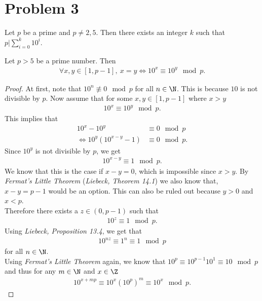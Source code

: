 \documentclass{article}
\begin{document}
\section*{Problem 3}
\begin{claim}
	Let $p$ be a prime and $p\not=2,5$. Then there exists an integer $k$ such that $p|\sum_{i=0}^k 10^i$.
\end{claim}
\begin{adjustwidth}{2em}{2em}
	\begin{lemma}
		\label{l2}
		Let $p>5$ be a prime number. Then
		\begin{align*}
			\forall x,y\in[1,p-1],\: x=y \Leftrightarrow 10^x\equiv 10^y\mod p.
		\end{align*}
	\end{lemma}
	\begin{proof}
		At first, note that $10^n \not\equiv 0 \mod p$ for all $n\in\N$.
		This is because $10$ is not divisible by $p$.
		Now assume that for some $x,y\in[1,p-1]$ where $x>y$
		\begin{align*}
			10^x \equiv 10^y \mod p.
		\end{align*}
		This implies that
		\begin{align*}
			10^x-10^y                        & \equiv 0\mod p   \\
			\Leftrightarrow 10^y(10^{x-y}-1) & \equiv 0 \mod p.
		\end{align*}
		Since $10^y$ is not divisible by $p$, we get
		\begin{align*}
			10^{x-y}\equiv 1 \mod p.
		\end{align*}
		We know that this is the case if $x-y=0$, which is impossible since $x>y$.
		By \emph{Fermat's Little Theorem} (\emph{Liebeck, Theorem 14.1}) we also know that, $x-y=p-1$ would be an option.
		This can also be ruled out because $y>0$ and $x<p$.\\
		Therefore there exists a $z\in(0,p-1)$ such that
		\begin{align*}
			10^z \equiv 1 \mod p.
		\end{align*}
		Using \emph{Liebeck, Proposition 13.4}, we get that
		\begin{align*}
			10^{nz}\equiv 1^n\equiv 1 \mod p
		\end{align*}
		for all $n\in\N$. \\
		Using \emph{Fermat's Little Theorem} again, we know that $10^p\equiv 10^{p-1}10^1\equiv 10\mod p$ and thus for any $m\in\N$ and $x\in\Z$
		\begin{align*}
			10^{x+mp}\equiv 10^{x}\left(10^{p}\right)^m\equiv 10^{x}\mod p.

\end{align*}
\end{proof}
\end{adjustwidth}
\end{document}
